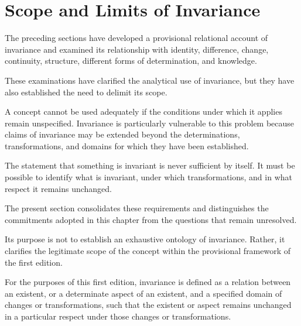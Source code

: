 
\section{Scope and Limits of Invariance}
\label{sec:scope-and-limits-of-invariance}


The preceding sections have developed a provisional
relational account of invariance and examined its
relationship with identity, difference, change,
continuity, structure, different forms of determination,
and knowledge.

These examinations have clarified the analytical
use of invariance, but they have also established
the need to delimit its scope.

A concept cannot be used adequately if the conditions
under which it applies remain unspecified. Invariance
is particularly vulnerable to this problem because
claims of invariance may be extended beyond the
determinations, transformations, and domains for
which they have been established.

The statement that something is invariant is never
sufficient by itself. It must be possible to identify
what is invariant, under which transformations,
and in what respect it remains unchanged.

The present section consolidates these requirements
and distinguishes the commitments adopted in this
chapter from the questions that remain unresolved.

Its purpose is not to establish an exhaustive
ontology of invariance. Rather, it clarifies the
legitimate scope of the concept within the
provisional framework of the first edition.


For the purposes of this first edition, invariance
is defined as a relation between an existent, or
a determinate aspect of an existent, and a specified
domain of changes or transformations, such that
the existent or aspect remains unchanged in a
particular respect under those changes or
transformations.

